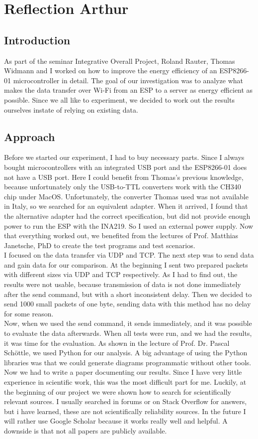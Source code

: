 \chapter*{Reflection Arthur}

\section*{Introduction}
As part of the seminar Integrative Overall Project, Roland Rauter,
Thomas Widmann and I worked on how to improve the energy efficiency of an ESP8266-01 microcontroller in detail.
The goal of our investigation was to analyze what makes the data transfer over Wi-Fi
from an ESP to a server as energy efficient as possible.
Since we all like to experiment,
we decided to work out the results ourselves instate of relying on existing data.


\section*{Approach}
Before we started our experiment, I had to buy necessary parts.
Since I always bought microcontrollers with an integrated USB port and the ESP8266-01
does not have a USB port. Here I could benefit from Thomas's previous knowledge,
because unfortunately only the USB-to-TTL converters work with the CH340 chip under MacOS.
Unfortunately, the converter Thomas used was not available in Italy,
so we searched for an equivalent adapter. When it arrived,
I found that the alternative adapter had the correct specification,
but did not provide enough power to run the ESP with the INA219.
So I used an external power supply. Now that everything worked out,
we benefited from the lectures of Prof. Matthias Janetsche, PhD
to create the test programs and test scenarios. \\
I focused on the data transfer via UDP and TCP.
The next step was to send data and gain data for our comparison.
At the beginning I sent two prepared packets with different sizes via UDP and TCP respectively.
As I had to find out, the results were not usable,
because transmission of data is not done immediately after the send command,
but with a short inconsistent delay.
Then we decided to send 1000 small packets of one byte,
sending data with this method has no delay for some reason.\\
Now,
when we used the send command, it sends immediately,
and it was possible to evaluate the data afterwards.
When all tests were run, and we had the results, it was time for the evaluation.
As shown in the lecture of Prof. Dr. Pascal Schöttle, we used Python for our analysis.
A big advantage of using the Python libraries was that we could generate diagrams programmatic
without other tools. Now we had to write a paper documenting our results.
Since I have very little experience in scientific work, this was the most difficult part for me.
Luckily, at the beginning of our project we were shown how to search for scientifically
relevant sources. I usually searched in forums or on Stack Overflow for answers,
but i have learned, these are not scientifically reliability sources.
In the future I will rather use Google Scholar because it works really well and helpful.
A downside is that not all papers are publicly available.


